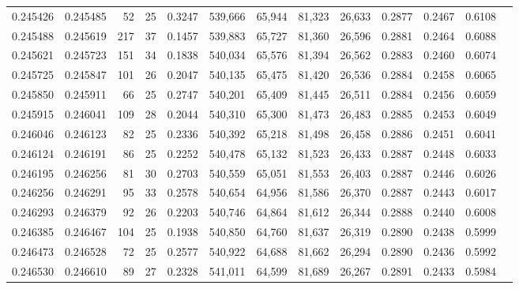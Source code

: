 \begin{tabular}{rrrrrrrrrrrrr}
0.245426 & 0.245485 &  52 &  25 &                                     0.3247 & 539,666 &  65,944 &  81,323 &  26,633 & 0.2877 & 0.2467 & 0.6108 \\
0.245488 & 0.245619 & 217 &  37 &                                     0.1457 & 539,883 &  65,727 &  81,360 &  26,596 & 0.2881 & 0.2464 & 0.6088 \\
0.245621 & 0.245723 & 151 &  34 &                                     0.1838 & 540,034 &  65,576 &  81,394 &  26,562 & 0.2883 & 0.2460 & 0.6074 \\
0.245725 & 0.245847 & 101 &  26 &                                     0.2047 & 540,135 &  65,475 &  81,420 &  26,536 & 0.2884 & 0.2458 & 0.6065 \\
0.245850 & 0.245911 &  66 &  25 &                                     0.2747 & 540,201 &  65,409 &  81,445 &  26,511 & 0.2884 & 0.2456 & 0.6059 \\
0.245915 & 0.246041 & 109 &  28 &                                     0.2044 & 540,310 &  65,300 &  81,473 &  26,483 & 0.2885 & 0.2453 & 0.6049 \\
0.246046 & 0.246123 &  82 &  25 &                                     0.2336 & 540,392 &  65,218 &  81,498 &  26,458 & 0.2886 & 0.2451 & 0.6041 \\
0.246124 & 0.246191 &  86 &  25 &                                     0.2252 & 540,478 &  65,132 &  81,523 &  26,433 & 0.2887 & 0.2448 & 0.6033 \\
0.246195 & 0.246256 &  81 &  30 &                                     0.2703 & 540,559 &  65,051 &  81,553 &  26,403 & 0.2887 & 0.2446 & 0.6026 \\
0.246256 & 0.246291 &  95 &  33 &                                     0.2578 & 540,654 &  64,956 &  81,586 &  26,370 & 0.2887 & 0.2443 & 0.6017 \\
0.246293 & 0.246379 &  92 &  26 &                                     0.2203 & 540,746 &  64,864 &  81,612 &  26,344 & 0.2888 & 0.2440 & 0.6008 \\
0.246385 & 0.246467 & 104 &  25 &                                     0.1938 & 540,850 &  64,760 &  81,637 &  26,319 & 0.2890 & 0.2438 & 0.5999 \\
0.246473 & 0.246528 &  72 &  25 &                                     0.2577 & 540,922 &  64,688 &  81,662 &  26,294 & 0.2890 & 0.2436 & 0.5992 \\
0.246530 & 0.246610 &  89 &  27 &                                     0.2328 & 541,011 &  64,599 &  81,689 &  26,267 & 0.2891 & 0.2433 & 0.5984 \\

\end{tabular}
